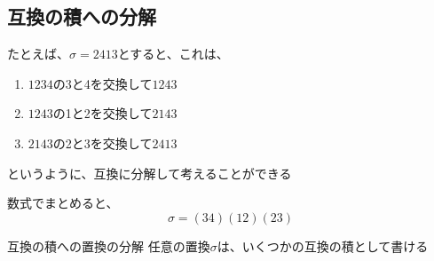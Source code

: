 \documentclass[../../../topic_linear-algebra]{subfiles}
\begin{document}
\subsection{互換の積への分解}

たとえば、$\sigma = 2413$とすると、これは、
\begin{enumerate}
  \item $1234$の3と4を交換して$1243$
  \item $1243$の1と2を交換して$2143$
  \item $2143$の2と3を交換して$2413$
\end{enumerate}
というように、互換に分解して考えることができる

数式でまとめると、
\begin{equation*}
  \sigma = (34)(12)(23)
\end{equation*}

\begin{theorem}{互換の積への置換の分解}
  任意の置換$\sigma$は、いくつかの互換の積として書ける
\end{theorem}
\end{document}
